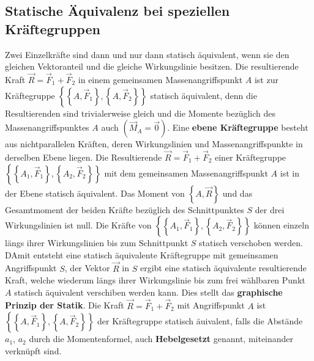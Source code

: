 \subsection{Statische Äquivalenz bei speziellen Kräftegruppen}
Zwei Einzelkräfte sind dann und nur dann statisch äquivalent, wenn sie den gleichen Vektoranteil und die gleiche Wirkungslinie besitzen.
\newline\newline
Die resultierende Kraft $\overrightarrow{R}=\overrightarrow{F}_1+\overrightarrow{F}_2$ in einem gemeinsamen Massenangriffspunkt $A$ ist zur Kräftegruppe $\left\{\left\{A, \overrightarrow{F}_1\right\}, \left\{A, \overrightarrow{F}_2\right\}\right\}$ statisch äquivalent, denn die Resultierenden sind trivialerweise gleich und die Momente bezüglich des Massenangriffspunktes $A$ auch $(\overrightarrow{M}_A=\overrightarrow{0})$.
\newline\newline
Eine \textbf{ebene Kräftegruppe} besteht aus nichtparallelen Kräften, deren Wirkungslinien und Massenangriffspunkte in derselben Ebene liegen. Die Resultierende $\overrightarrow{R}=\overrightarrow{F}_1+\overrightarrow{F}_2$ einer Kräftegruppe $\left\{\left\{A_1, \overrightarrow{F}_1\right\}, \left\{A_2, \overrightarrow{F}_2\right\}\right\}$ mit dem gemeinsamen Massenangriffspunkt $A$ ist in der Ebene statisch äquivalent. Das Moment von $\left\{A, \overrightarrow{R}\right\}$ und das Gesamtmoment der beiden Kräfte bezüglich des Schnittpunktes $S$ der drei Wirkungslinien ist null.
\newline\newline
Die Kräfte von $\left\{\left\{A_1, \overrightarrow{F}_1\right\}, \left\{A_2, \overrightarrow{F}_2\right\}\right\}$ können einzeln längs ihrer Wirkungslinien bis zum Schnittpunkt $S$ statisch verschoben werden. DAmit entsteht eine statisch äquivalente Kräftegruppe mit gemeinsamen Angriffspunkt $S$, der Vektor $\overrightarrow{R}$ in $S$
 ergibt eine statisch äquivalente resultierende Kraft, welche wiederum längs ihrer Wirkungslinie bis zum frei wählbaren Punkt $A$ statisch äquivalent verschiben werden kann. Dies stellt das \textbf{graphische Prinzip der Statik}.
 \newline
 Die Kraft $\overrightarrow{R}=\overrightarrow{F}_1+\overrightarrow{F}_2$ mit Angriffspunkt $A$ ist $\left\{\left\{A, \overrightarrow{F}_1\right\}, \left\{A, \overrightarrow{F}_2\right\}\right\}$ der Kräftegruppe statisch äuivalent, falls die Abstände $a_1$, $a_2$ durch die Momentenformel, auch \textbf{Hebelgesetzt} genannt, miteinander verknüpft sind.
